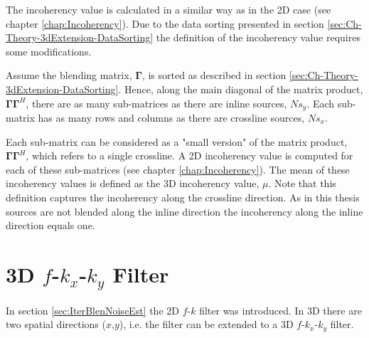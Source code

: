 The incoherency value is calculated in a similar way as in the 2D case (see chapter \ref{chap:Incoherency}). Due to the data sorting presented in section \ref{sec:Ch-Theory-3dExtension-DataSorting} the definition of the incoherency value requires some modifications.

Assume the blending matrix, $\mathbf{\Gamma}$, is sorted as described in section \ref{sec:Ch-Theory-3dExtension-DataSorting}. Hence, along the main diagonal of the matrix product, $\mathbf{\Gamma \Gamma}^H$, there are as many sub-matrices as there are inline sources, $Ns_y$. Each sub-matrix has as many rows and columns as there are crossline sources, $Ns_x$.

Each sub-matrix can be considered as a "small version" of the matrix product, $\mathbf{\Gamma \Gamma}^H$, which refers to a single crossline. A 2D incoherency value is computed for each of these sub-matrices (see chapter \ref{chap:Incoherency}). The mean of these incoherency values is defined as the 3D incoherency value, $\mu$. Note that this definition captures the incoherency along the crossline direction. As in this thesis sources are not blended along the inline direction the incoherency along the inline direction equals one.

\section{3D $f$-$k_x$-$k_y$ Filter} \label{sec:Ch-Theory-3dExtension-FKK}

In section \ref{sec:IterBlenNoiseEst} the 2D $f$-$k$ filter was introduced. In 3D there are two spatial directions ($x$,$y$), i.e. the filter can be extended to a 3D $f$-$k_x$-$k_y$ filter.

